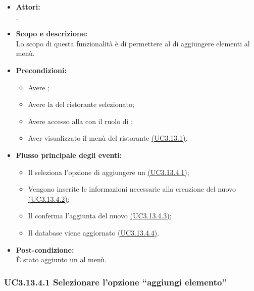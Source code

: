 \begin{itemize}
	\item \textbf{Attori:}
	\\.
	\item \textbf{Scopo e descrizione:} 
	\\Lo scopo di questa funzionalità è di permettere al  di aggiungere elementi al menù.
	\item \textbf{Precondizioni:}
	\begin{itemize}
		\item Avere ;
		\item Avere la  del ristorante selezionato;
		\item Avere accesso alla  con il ruolo di ;
		\item Aver visualizzato il menù del ristorante \hyperref[UC3.13.1]{(UC3.13.1)}.
	\end{itemize}
	\item \textbf{Flusso principale degli eventi:}
	\begin{itemize}
		\item Il  seleziona l'opzione di aggiungere un  \hyperref[UC3.13.4.1]{(UC3.13.4.1)};
		\item Vengono inserite le informazioni necessarie alla creazione del nuovo  \hyperref[UC3.13.4.2]{(UC3.13.4.2)};
		\item Il  conferma l'aggiunta del nuovo  \hyperref[UC3.13.4.3]{(UC3.13.4.3)};
		\item Il database viene aggiornato \hyperref[UC3.13.4.4]{(UC3.13.4.4)}.
	\end{itemize}
	\item \textbf{Post-condizione:}
	\\È stato aggiunto un  al menù.
\end{itemize}

\subsubsection{UC3.13.4.1 Selezionare l'opzione “aggiungi elemento”} \label{UC3.13.4.1}

